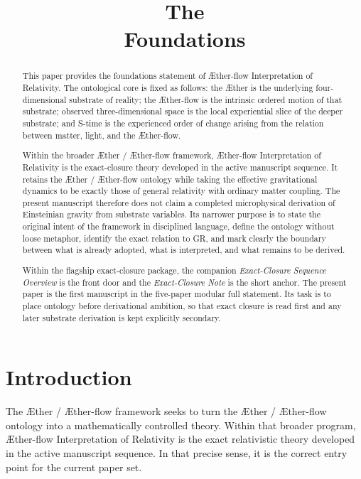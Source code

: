 \documentclass[11pt]{article}
\title{\textbf{The \TheoryName{}}\\[0.4em]
\large Foundations}
\author{}
\date{}
\newcommand{\Aether}{\AE{}ther}
\newcommand{\Aflow}{\AE{}ther-flow}
\newcommand{\TheoryName}{\Aflow{} Interpretation of Relativity}
\newcommand{\TheoryProgram}{\Aether{} / \Aflow{} framework}
\begin{document}
\maketitle

\begin{abstract}
This paper provides the foundations statement of \TheoryName{}. The ontological core is fixed as follows: the \Aether{} is the underlying four-dimensional substrate of reality; the \Aflow{} is the intrinsic ordered motion of that substrate; observed three-dimensional space is the local experiential slice of the deeper substrate; and S-time is the experienced order of change arising from the relation between matter, light, and the \Aflow{}.

Within the broader \TheoryProgram{}, \TheoryName{} is the exact-closure theory developed in the active manuscript sequence. It retains the \Aether{} / \Aflow{} ontology while taking the effective gravitational dynamics to be exactly those of general relativity with ordinary matter coupling. The present manuscript therefore does not claim a completed microphysical derivation of Einsteinian gravity from substrate variables. Its narrower purpose is to state the original intent of the framework in disciplined language, define the ontology without loose metaphor, identify the exact relation to GR, and mark clearly the boundary between what is already adopted, what is interpreted, and what remains to be derived.

Within the flagship exact-closure package, the companion \emph{Exact-Closure Sequence Overview} is the front door and the \emph{Exact-Closure Note} is the short anchor. The present paper is the first manuscript in the five-paper modular full statement. Its task is to place ontology before derivational ambition, so that exact closure is read first and any later substrate derivation is kept explicitly secondary.
%
\end{abstract}

\section{Introduction}

The \TheoryProgram{} seeks to turn the \Aether{} / \Aflow{} ontology into a mathematically controlled theory. Within that broader program, \TheoryName{} is the exact relativistic theory developed in the active manuscript sequence. In that precise sense, it is the correct entry point for the current paper set.
\end{document}
